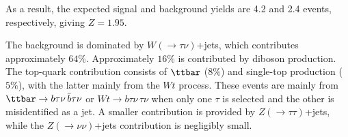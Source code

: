 \begin{table}[htbp]
    \centering
    \small
    \caption{Signal and background cutflow for $\bTagSR$-$\Res$. The signal is evaluated at $(\MU,\gU,\beta_L^{23})=(1.5~\TeV,1.5,0.6)$. The uncertainties are from MC statistics only.}
    \label{tab:ch7_cutflow_res}
    \setlength{\tabcolsep}{3pt}
\end{table}

As a result, the expected signal and background yields are 4.2 and 2.4 events, respectively, giving $Z=1.95$.

The background is dominated by $W(\to\tau\nu)$+jets, which contributes approximately $64\%$.
Approximately $16\%$ is contributed by diboson production.
The top-quark contribution consists of $\ttbar$ ($8\%$) and single-top production ($5\%$), with the latter mainly from the $Wt$ process.
These events are mainly from $\ttbar\to b\tau\nu\,\bar b\tau\nu$ or $Wt\to b\tau\nu\,\tau\nu$ when only one $\tau$ is selected and the other is misidentified as a jet.
A smaller contribution is provided by $Z(\to\tau\tau)$+jets, while the $Z(\to\nu\nu)$+jets contribution is negligibly small.


